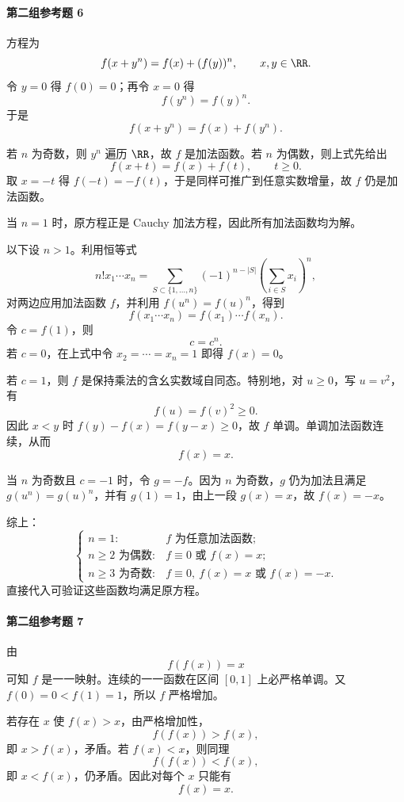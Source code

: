 \paragraph{第二组参考题 6}
\begin{xsolution}
方程为
\[
 f(x+y^n)=f(x)+(f(y))^n,
 \qquad x,y\in\RR.
\]
令 $y=0$ 得 $f(0)=0$；再令 $x=0$ 得
\[
 f(y^n)=f(y)^n.
\]
于是
\[
 f(x+y^n)=f(x)+f(y^n).
\]

若 $n$ 为奇数，则 $y^n$ 遍历 $\RR$，故 $f$ 是加法函数。若 $n$ 为偶数，则上式先给出
\[
 f(x+t)=f(x)+f(t),\qquad t\ge0.
\]
取 $x=-t$ 得 $f(-t)=-f(t)$，于是同样可推广到任意实数增量，故 $f$ 仍是加法函数。

当 $n=1$ 时，原方程正是 Cauchy 加法方程，因此所有加法函数均为解。

以下设 $n>1$。利用恒等式
\[
 n!x_1\cdots x_n
 =\sum_{S\subset\{1,\ldots,n\}}
 (-1)^{n-|S|}
 \left(\sum_{i\in S}x_i\right)^n,
\]
对两边应用加法函数 $f$，并利用 $f(u^n)=f(u)^n$，得到
\[
 f(x_1\cdots x_n)=f(x_1)\cdots f(x_n).
\]
令 $c=f(1)$，则
\[
 c=c^n.
\]
若 $c=0$，在上式中令 $x_2=\cdots=x_n=1$ 即得 $f(x)=0$。

若 $c=1$，则 $f$ 是保持乘法的含幺实数域自同态。特别地，对 $u\ge0$，写 $u=v^2$，有
\[
 f(u)=f(v)^2\ge0.
\]
因此 $x<y$ 时 $f(y)-f(x)=f(y-x)\ge0$，故 $f$ 单调。单调加法函数连续，从而
\[
 f(x)=x.
\]

当 $n$ 为奇数且 $c=-1$ 时，令 $g=-f$。因为 $n$ 为奇数，$g$ 仍为加法且满足 $g(u^n)=g(u)^n$，并有 $g(1)=1$，由上一段 $g(x)=x$，故 $f(x)=-x$。

综上：
\[
\begin{cases}
 n=1:& f\text{ 为任意加法函数};\\
 n\ge2\text{ 为偶数}:& f\equiv0\text{ 或 }f(x)=x;\\
 n\ge3\text{ 为奇数}:& f\equiv0,\ f(x)=x\text{ 或 }f(x)=-x.
\end{cases}
\]
直接代入可验证这些函数均满足原方程。
\end{xsolution}

\paragraph{第二组参考题 7}
\begin{xsolution}
由
\[
 f(f(x))=x
\]
可知 $f$ 是一一映射。连续的一一函数在区间 $[0,1]$ 上必严格单调。又 $f(0)=0<f(1)=1$，所以 $f$ 严格增加。

若存在 $x$ 使 $f(x)>x$，由严格增加性，
\[
 f(f(x))>f(x),
\]
即 $x>f(x)$，矛盾。若 $f(x)<x$，则同理
\[
 f(f(x))<f(x),
\]
即 $x<f(x)$，仍矛盾。因此对每个 $x$ 只能有
\[
 f(x)=x.
\]
\end{xsolution}

